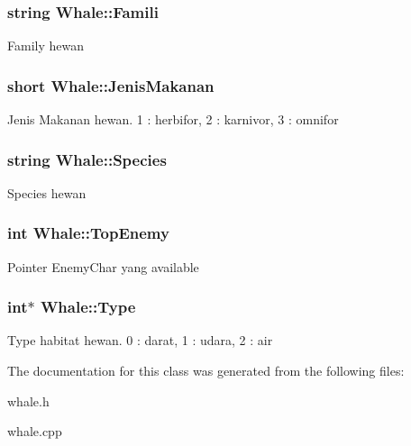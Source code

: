 \subsubsection[{\texorpdfstring{Famili}{Famili}}]{\setlength{\rightskip}{0pt plus 5cm}string Whale\+::\+Famili\hspace{0.3cm}{\ttfamily [protected]}}\hypertarget{class_whale_a3f74608928bf2fe5936089bded6b6b7e}{}\label{class_whale_a3f74608928bf2fe5936089bded6b6b7e}
Family hewan 
\subsubsection[{\texorpdfstring{Jenis\+Makanan}{JenisMakanan}}]{\setlength{\rightskip}{0pt plus 5cm}short Whale\+::\+Jenis\+Makanan\hspace{0.3cm}{\ttfamily [protected]}}\hypertarget{class_whale_a80cea4b1a7fc33a8ada08128d89d7ef5}{}\label{class_whale_a80cea4b1a7fc33a8ada08128d89d7ef5}
Jenis Makanan hewan. 1 \+: herbifor, 2 \+: karnivor, 3 \+: omnifor 
\subsubsection[{\texorpdfstring{Species}{Species}}]{\setlength{\rightskip}{0pt plus 5cm}string Whale\+::\+Species\hspace{0.3cm}{\ttfamily [protected]}}\hypertarget{class_whale_a72e4a2780fbe5454c3d652ccfb26ff8a}{}\label{class_whale_a72e4a2780fbe5454c3d652ccfb26ff8a}
Species hewan 
\subsubsection[{\texorpdfstring{Top\+Enemy}{TopEnemy}}]{\setlength{\rightskip}{0pt plus 5cm}int Whale\+::\+Top\+Enemy\hspace{0.3cm}{\ttfamily [protected]}}\hypertarget{class_whale_add2564af64cc181a774302bac2aa827d}{}\label{class_whale_add2564af64cc181a774302bac2aa827d}
Pointer Enemy\+Char yang available 
\subsubsection[{\texorpdfstring{Type}{Type}}]{\setlength{\rightskip}{0pt plus 5cm}int$\ast$ Whale\+::\+Type\hspace{0.3cm}{\ttfamily [protected]}}\hypertarget{class_whale_a5ef06647a7c0ba3de1e78cf8b96a48b2}{}\label{class_whale_a5ef06647a7c0ba3de1e78cf8b96a48b2}
Type habitat hewan. 0 \+: darat, 1 \+: udara, 2 \+: air 

The documentation for this class was generated from the following files\+:\begin{DoxyCompactItemize}
\item 
whale.\+h\item 
whale.\+cpp\end{DoxyCompactItemize}
